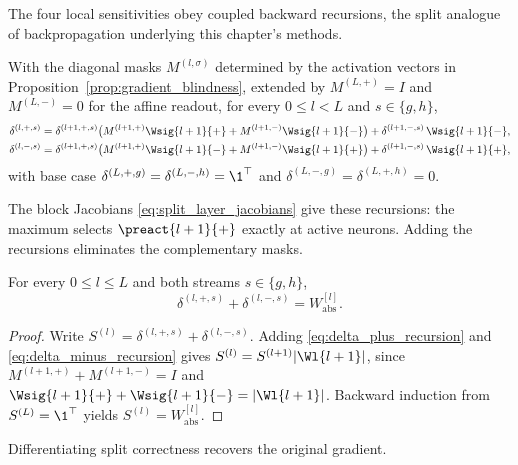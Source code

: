 The four local sensitivities obey coupled backward recursions, the split analogue of backpropagation underlying this chapter's methods.

\begin{lemmaenv}\label{lem:split_backward_recursion}
With the diagonal masks $M^{(l,\sigma)}$ determined by the activation vectors in Proposition~\ref{prop:gradient_blindness}, extended by $M^{(L,+)}=I$ and $M^{(L,-)}=0$ for the affine readout, for every $0 \leq l < L$ and $s \in \{g, h\}$,
\begin{align}
	\delta^{(l, +, s)}
	&= \delta^{(l+1, +, s)} \bigl( M^{(l+1, +)} \Wsig{l+1}{+} + M^{(l+1, -)} \Wsig{l+1}{-} \bigr)
	+ \delta^{(l+1, -, s)} \, \Wsig{l+1}{-},
	\label{eq:delta_plus_recursion} \\
	\delta^{(l, -, s)}
	&= \delta^{(l+1, +, s)} \bigl( M^{(l+1, +)} \Wsig{l+1}{-} + M^{(l+1, -)} \Wsig{l+1}{+} \bigr)
	+ \delta^{(l+1, -, s)} \, \Wsig{l+1}{+},
	\label{eq:delta_minus_recursion}
\end{align}
with base case $\delta^{(L, +, g)} = \delta^{(L, -, h)} = \1^{\top}$ and $\delta^{(L, -, g)} = \delta^{(L, +, h)} = 0$.\end{lemmaenv}

The block Jacobians \eqref{eq:split_layer_jacobians} give these recursions: the maximum selects $\preact{l+1}{+}$ exactly at active neurons. Adding the recursions eliminates the complementary masks.

\begin{proposition}\label{prop:sensitivity_mass}
For every $0 \leq l \leq L$ and both streams $s \in \{g, h\}$,
\begin{equation}
	\delta^{(l, +, s)} + \delta^{(l, -, s)} = W_{\mathrm{abs}}^{[l]}.
	\label{eq:mass_conservation}
\end{equation}\end{proposition}

\begin{proof}
Write $S^{(l)}=\delta^{(l,+,s)}+\delta^{(l,-,s)}$. Adding \eqref{eq:delta_plus_recursion} and \eqref{eq:delta_minus_recursion} gives $S^{(l)}=S^{(l+1)}|\Wl{l+1}|$, since $M^{(l+1,+)}+M^{(l+1,-)}=I$ and $\Wsig{l+1}{+}+\Wsig{l+1}{-}=|\Wl{l+1}|$. Backward induction from $S^{(L)}=\1^\top$ yields $S^{(l)}=W_{\mathrm{abs}}^{[l]}$.
\end{proof}

Differentiating split correctness recovers the original gradient.

